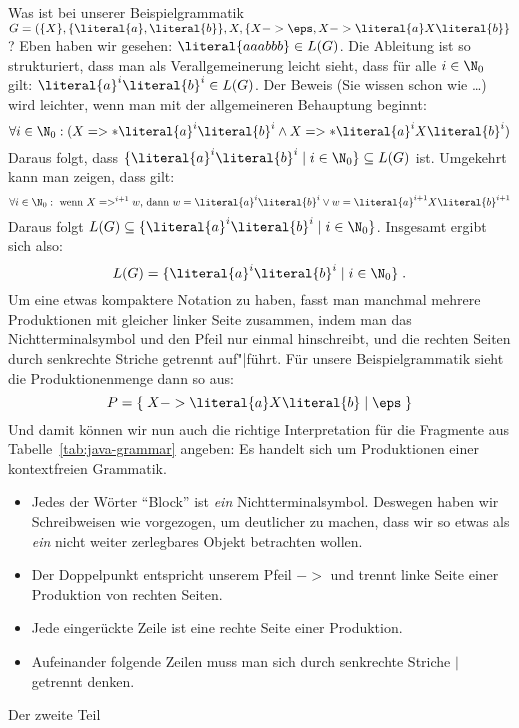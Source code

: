 Was ist bei unserer Beispielgrammatik $G=(\{X\},\{\literal{a},
\literal{b}\}, X, \{X-> \eps, X->\literal{a} X\literal{b} \}$? Eben
haben wir gesehen: $\literal{aaabbb}\in L(G)$. Die Ableitung ist so
strukturiert, dass man als Verallgemeinerung leicht sieht, dass für
alle $i\in\N_0$ gilt: $\literal{a}^i\literal{b}^i\in L(G)$. Der Beweis
(Sie wissen schon wie \dots) wird leichter, wenn man mit der
allgemeineren Behauptung beginnt:
\[
\forall i\in\N_0: ( X =>* \literal{a}^i\literal{b}^i 
\land X =>* \literal{a}^i X\literal{b}^i )
\]
Daraus folgt, dass $\{\literal{a}^i \literal{b}^i\mid
i\in\N_0\}\subseteq L(G)$ ist.  Umgekehrt kann man zeigen, dass gilt:
\[
\forall i\in\N_0: \text{ wenn } X =>^{i+1} w \text{, dann } w= \literal{a}^i
\literal{b}^i \lor w= \literal{a}^{i+1} X\literal{b}^{i+1}
\]
Daraus folgt $ L(G)\subseteq\{\literal{a}^i \literal{b}^i\mid
i\in\N_0\}$. Insgesamt ergibt sich also:
\[
L(G) = \{ \literal{a}^i\literal{b}^i \mid i\in\N_0 \} \;.
\]
%
Um eine etwas kompaktere Notation zu haben, fasst man manchmal mehrere
Produktionen mit gleicher linker Seite zusammen, indem man das
Nichtterminalsymbol und den Pfeil nur einmal hinschreibt, und die
rechten Seiten durch senkrechte Striche getrennt auf"|führt. Für
unsere Beispielgrammatik sieht die Produktionenmenge dann so aus:
\[
P = \{\;  X -> \literal{a} X \literal{b} \;|\; \eps \;\}
\]
%
Und  damit können  wir nun  auch die  richtige Interpretation  für die
Fragmente aus Tabelle~\ref{tab:java-grammar}  angeben: Es handelt sich
um Produktionen einer kontextfreien Grammatik.
%
\begin{itemize}
\item Jedes der Wörter "`Block"' ist \emph{ein} Nichtterminalsymbol.
  Deswegen haben wir Schreibweisen wie  vorgezogen, um
  deutlicher zu machen, dass wir so etwas als \emph{ein} nicht weiter
  zerlegbares Objekt betrachten wollen.
\item Der Doppelpunkt entspricht unserem Pfeil $->$ und trennt linke
  Seite einer Produktion von rechten Seiten.
\item Jede eingerückte Zeile ist eine rechte Seite einer Produktion.
\item Aufeinander folgende Zeilen muss man sich durch senkrechte
  Striche $|$ getrennt denken.
\end{itemize}
%
Der zweite Teil \\[0pt]

